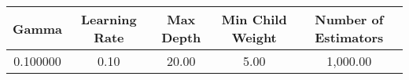 \footnotesize
\begin{tabular}{ccccc}
\toprule
Gamma & Learning Rate & Max Depth & Min Child Weight & Number of Estimators \\
\midrule
0.100000 & 0.10 & 20.00 & 5.00 & 1,000.00 \\
\bottomrule
\end{tabular}

\normalsize